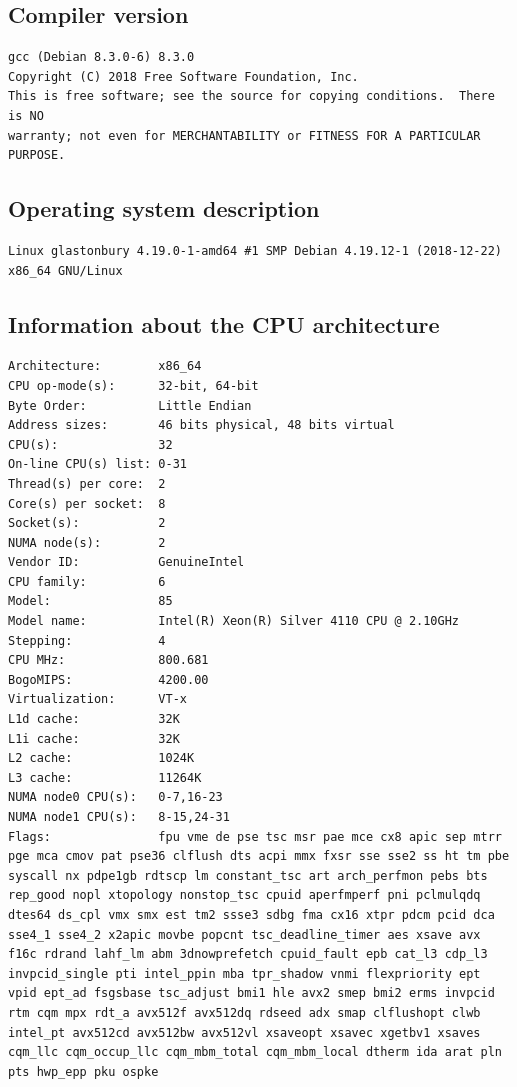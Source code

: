 	\subsection{Compiler version}
	\begin{lstlisting}[frame=single]
gcc (Debian 8.3.0-6) 8.3.0
Copyright (C) 2018 Free Software Foundation, Inc.
This is free software; see the source for copying conditions.  There is NO
warranty; not even for MERCHANTABILITY or FITNESS FOR A PARTICULAR PURPOSE.
\end{lstlisting}
	
	\subsection{Operating system description}
\begin{lstlisting}[frame=single]
Linux glastonbury 4.19.0-1-amd64 #1 SMP Debian 4.19.12-1 (2018-12-22) x86_64 GNU/Linux
\end{lstlisting}
	\subsection{Information about the CPU architecture}
	\begin{lstlisting}[frame=single]
Architecture:        x86_64
CPU op-mode(s):      32-bit, 64-bit
Byte Order:          Little Endian
Address sizes:       46 bits physical, 48 bits virtual
CPU(s):              32
On-line CPU(s) list: 0-31
Thread(s) per core:  2
Core(s) per socket:  8
Socket(s):           2
NUMA node(s):        2
Vendor ID:           GenuineIntel
CPU family:          6
Model:               85
Model name:          Intel(R) Xeon(R) Silver 4110 CPU @ 2.10GHz
Stepping:            4
CPU MHz:             800.681
BogoMIPS:            4200.00
Virtualization:      VT-x
L1d cache:           32K
L1i cache:           32K
L2 cache:            1024K
L3 cache:            11264K
NUMA node0 CPU(s):   0-7,16-23
NUMA node1 CPU(s):   8-15,24-31
Flags:               fpu vme de pse tsc msr pae mce cx8 apic sep mtrr pge mca cmov pat pse36 clflush dts acpi mmx fxsr sse sse2 ss ht tm pbe syscall nx pdpe1gb rdtscp lm constant_tsc art arch_perfmon pebs bts rep_good nopl xtopology nonstop_tsc cpuid aperfmperf pni pclmulqdq dtes64 ds_cpl vmx smx est tm2 ssse3 sdbg fma cx16 xtpr pdcm pcid dca sse4_1 sse4_2 x2apic movbe popcnt tsc_deadline_timer aes xsave avx f16c rdrand lahf_lm abm 3dnowprefetch cpuid_fault epb cat_l3 cdp_l3 invpcid_single pti intel_ppin mba tpr_shadow vnmi flexpriority ept vpid ept_ad fsgsbase tsc_adjust bmi1 hle avx2 smep bmi2 erms invpcid rtm cqm mpx rdt_a avx512f avx512dq rdseed adx smap clflushopt clwb intel_pt avx512cd avx512bw avx512vl xsaveopt xsavec xgetbv1 xsaves cqm_llc cqm_occup_llc cqm_mbm_total cqm_mbm_local dtherm ida arat pln pts hwp_epp pku ospke
\end{lstlisting}
	
